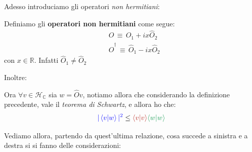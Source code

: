 	Adesso introduciamo gli operatori \textit{non hermitiani}:
	
\begin{mydef}
	Definiamo gli \textbf{operatori non hermitiani} come segue:
\begin{align*}
	&\hat{O} \, \equiv \, \hat{O}_1 + ix\hat{O}_2  \\
	&\hat{O}^{\dagger} \, \equiv \,  \hat{O}_1 - ix\hat{O}_2
\end{align*}
	con $x \in \mathbb{R}$. Infatti $\hat{O}_1 \neq \hat{O}_2$
\end{mydef}

	Inoltre:
	
\begin{nb}
	 Ora $\forall v \in \mathcal{H}_{\mathbb{C}}$ sia $w = \hat{O}v$, notiamo allora che considerando la definizione precedente, vale il \textit{teorema di Schwartz}, e allora ho che:
\begin{align*}
	\textcolor{blue}{|\braket{v}{w}|^2} \leq \textcolor{BrickRed}{\braket{v}} \textcolor{ForestGreen}{\braket{w}}
\end{align*}
\end{nb}

	Vediamo allora, partendo da quest'ultima relazione, cosa succede a sinistra e a destra si si fanno delle considerazioni:
	
